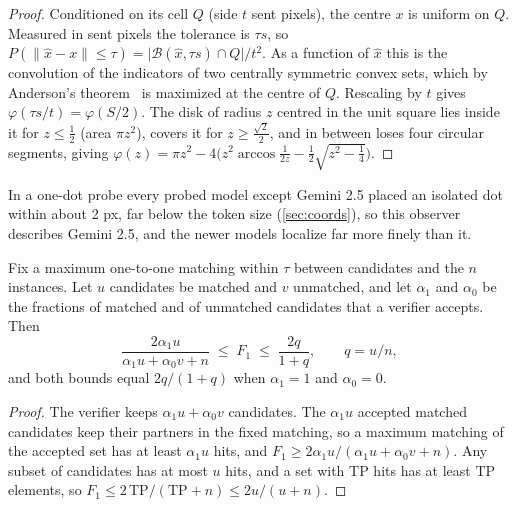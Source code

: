 \begin{proof}
Conditioned on its cell $Q$ (side $t$ sent pixels), the centre $x$ is uniform on $Q$. Measured in sent pixels the tolerance is $\tau s$, so $P(\lVert \hat x - x\rVert \le \tau) = \lvert \mathcal{B}(\hat x, \tau s) \cap Q\rvert / t^2$. As a function of $\hat x$ this is the convolution of the indicators of two centrally symmetric convex sets, which by Anderson's theorem~\cite{anderson1955integral} is maximized at the centre of $Q$. Rescaling by $t$ gives $\varphi(\tau s/t) = \varphi(S/2)$. The disk of radius $z$ centred in the unit square lies inside it for $z \le \tfrac12$ (area $\pi z^2$), covers it for $z \ge \tfrac{\sqrt2}{2}$, and in between loses four circular segments, giving $\varphi(z) = \pi z^2 - 4\big(z^2\arccos\tfrac{1}{2z} - \tfrac12\sqrt{z^2 - \tfrac14}\big)$.
\end{proof}

In a one-dot probe every probed model except Gemini 2.5 placed an isolated dot within about 2 px, far below the token size (\cref{sec:coords}), so this observer describes Gemini 2.5, and the newer models localize far more finely than it.

\begin{proposition}
\label{prop:hybrid}
Fix a maximum one-to-one matching within $\tau$ between candidates and the $n$ instances. Let $u$ candidates be matched and $v$ unmatched, and let $\alpha_1$ and $\alpha_0$ be the fractions of matched and of unmatched candidates that a verifier accepts. Then
\[
\frac{2\alpha_1 u}{\alpha_1 u + \alpha_0 v + n} \;\le\; F_1 \;\le\; \frac{2q}{1+q}, \qquad q = u/n,
\]
and both bounds equal $2q/(1+q)$ when $\alpha_1 = 1$ and $\alpha_0 = 0$.
\end{proposition}

\begin{proof}
The verifier keeps $\alpha_1 u + \alpha_0 v$ candidates. The $\alpha_1 u$ accepted matched candidates keep their partners in the fixed matching, so a maximum matching of the accepted set has at least $\alpha_1 u$ hits, and $F_1 \ge 2\alpha_1 u/(\alpha_1 u + \alpha_0 v + n)$. Any subset of candidates has at most $u$ hits, and a set with $\mathrm{TP}$ hits has at least $\mathrm{TP}$ elements, so $F_1 \le 2\,\mathrm{TP}/(\mathrm{TP} + n) \le 2u/(u + n)$.
\end{proof}
